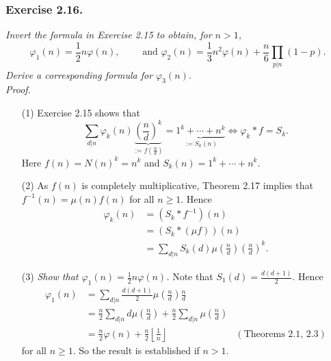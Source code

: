 \documentclass{article}
\begin{document}



\subsubsection*{Exercise 2.16.}
\emph{Invert the formula in Exercise 2.15 to obtain, for $n > 1$,
\[
  \varphi_1(n) = \frac{1}{2}n\varphi(n),
  \qquad\text{ and }
  \varphi_2(n) = \frac{1}{3}n^2 \varphi(n) + \frac{n}{6} \prod_{p|n}(1-p).
\]
Derive a corresponding formula for $\varphi_3(n)$.} \\



\emph{Proof.}
\begin{enumerate}
\item[(1)]
  Exercise 2.15 shows that
  \[
    \sum_{d|n} \varphi_k(n) \underbrace{\left(\frac{n}{d}\right)^k}_{:= f\left(\frac{n}{d}\right)}
        = \underbrace{1^k + \cdots + n^k}_{:= S_k(n)}
    \Longleftrightarrow
    \varphi_k * f = S_k.
  \]
  Here $f(n) = N(n)^k = n^k$ and $S_k(n) = 1^k + \cdots + n^k$.

\item[(2)]
  As $f(n)$ is completely multiplicative,
  Theorem 2.17 implies that $f^{-1}(n) = \mu(n) f(n)$ for all $n \geq 1$.
  Hence
  \begin{align*}
    \varphi_k(n)
    &= (S_k * f^{-1})(n) \\
    &= (S_k * (\mu f))(n) \\
    &= \sum_{d|n} S_k(d) \mu\left(\frac{n}{d}\right)\left(\frac{n}{d}\right)^k.
  \end{align*}

\item[(3)]
  \emph{Show that $\varphi_1(n) = \frac{1}{2}n\varphi(n)$.}
  Note that $S_1(d) = \frac{d(d+1)}{2}$.
  Hence
  \begin{align*}
    \varphi_1(n)
    &= \sum_{d|n} \frac{d(d+1)}{2} \mu\left(\frac{n}{d}\right) \frac{n}{d} \\
    &= \frac{n}{2} \sum_{d|n} d \mu\left(\frac{n}{d}\right)
        + \frac{n}{2} \sum_{d|n} \mu\left(\frac{n}{d}\right) \\
    &= \frac{n}{2} \varphi(n)
        + \frac{n}{2} \left\lfloor \frac{1}{n} \right\rfloor
      &(\text{Theorems 2.1, 2.3})
  \end{align*}
  for all $n \geq 1$.
  So the result is established if $n > 1$.


\end{enumerate}
\end{document}
